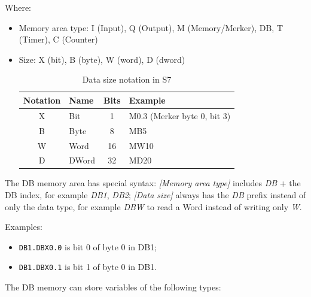 \documentclass[../main.tex]{subfiles}
\begin{document}
Where: 
\begin{itemize}
    \item Memory area type: I (Input), Q (Output), M (Memory/Merker), DB, T (Timer), C (Counter)
    \item Size: X (bit), B (byte), W (word), D (dword)
    
    \begin{table}[H]
        \centering
        \caption{Data size notation in S7}
        \label{tab:s7-data-size}
        \footnotesize
        \begin{tabular}{|c|l|c|l|}
            \hline
            \textbf{Notation} & \textbf{Name} & \textbf{Bits} & \textbf{Example} \\
            \hline
            X & Bit & 1 & M0.3 (Merker byte 0, bit 3) \\
            \hline
            B & Byte & 8 & MB5 \\
            \hline
            W & Word & 16 & MW10 \\
            \hline
            D & DWord & 32 & MD20 \\
            \hline
        \end{tabular}
    \end{table}
    
\end{itemize}


The DB memory area has special syntax: \textit{[Memory area type]} includes \textit{DB} + the DB index, for example \textit{DB1}, \textit{DB2}; \textit{[Data size]} always has the \textit{DB} prefix instead of only the data type, for example \textit{DBW} to read a Word instead of writing only \textit{W}.

Examples: 

\begin{itemize}
    \item \texttt{DB1.DBX0.0} is bit 0 of byte 0 in DB1;
    \item \texttt{DB1.DBX0.1} is bit 1 of byte 0 in DB1.
\end{itemize}

The DB memory can store variables of the following types:
\end{document}
